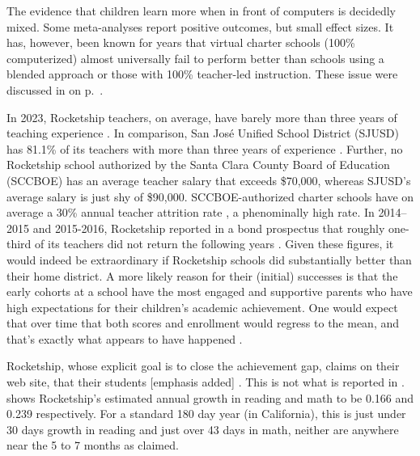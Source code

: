 The evidence that children learn more when in front of computers is decidedly mixed. Some meta-analyses report positive outcomes, but small effect sizes. It has, however, been known for years that virtual charter schools (100\% computerized) almost universally fail to perform better than schools using a blended approach or those with 100\% teacher-led instruction. These issue were discussed in  on p.~\pageref{sec:types-instruction}.


In 2023, Rocketship teachers, on average, have barely more than three years of teaching experience \parencite{SCCOE14-23}. In comparison, San José Unified School District (SJUSD) has 81.1\% of its teachers with more than three years of experience \parencite{USNews2023}. Further, no Rocketship school authorized by the Santa Clara County Board of Education (SCCBOE) has an average teacher salary that exceeds \$70,000, whereas SJUSD's average salary is just shy of \$90,000. SCCBOE-authorized charter schools have on average a 30\% annual teacher attrition rate \parencite{SCCOE14-23}, a phenominally high rate. In 2014–2015 and 2015-2016, Rocketship reported in a bond prospectus that roughly one-third of its teachers did not return the following years \parencite{CSFA2017}. Given these figures, it would indeed be extraordinary if Rocketship schools did substantially better than their home district. A more likely reason for their (initial) successes is that the early cohorts at a school have the most engaged and supportive parents who have high expectations for their children's academic achievement. One would expect that over time that both scores and enrollment would regress to the mean, and that's exactly what appears to have happened \parencite{SCCOE14-23}. 

Rocketship, whose explicit goal is to close the achievement gap, claims on their web site, that their students
 [emphasis added] \parencite{RSED2023}. This is not what is reported in \textcite{Raymond.etal2023}. \textcite[132]{Raymond.etal2023} shows Rocketship's estimated annual growth in reading and math to be 0.166 and 0.239 respectively. For a standard 180 day year (in California), this is just under 30 days growth in reading and just over 43 days in math, neither are anywhere near the 5 to 7 months as claimed.


